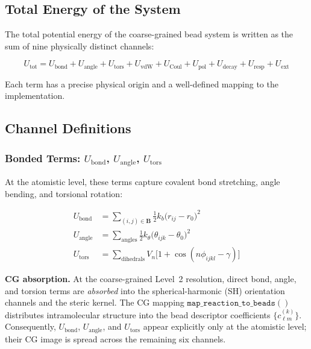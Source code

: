 \documentclass[11pt, a4paper, oneside]{article}
\begin{document}
\subsection{Total Energy of the System}

The total potential energy of the coarse-grained bead system is written as
the sum of nine physically distinct channels:

\begin{equation}
\boxed{
U_{\mathrm{tot}}
= U_{\mathrm{bond}}
+ U_{\mathrm{angle}}
+ U_{\mathrm{tors}}
+ U_{\mathrm{vdW}}
+ U_{\mathrm{Coul}}
+ U_{\mathrm{pol}}
+ U_{\mathrm{decay}}
+ U_{\mathrm{resp}}
+ U_{\mathrm{ext}}
}
\label{eq:Utot}
\end{equation}

Each term has a precise physical origin and a well-defined mapping to the
implementation.

\subsection{Channel Definitions}

\subsubsection{Bonded Terms:
  \texorpdfstring{$U_{\mathrm{bond}}$, $U_{\mathrm{angle}}$,
  $U_{\mathrm{tors}}$}{U\_bond, U\_angle, U\_tors}}

At the atomistic level, these terms capture covalent bond stretching,
angle bending, and torsional rotation:

\begin{align}
U_{\mathrm{bond}}  &= \sum_{(i,j) \in \mathbf{B}} \tfrac{1}{2} k_b
                       \bigl(r_{ij} - r_0\bigr)^2
  \label{eq:Ubond} \\[6pt]
U_{\mathrm{angle}} &= \sum_{\mathrm{angles}} \tfrac{1}{2} k_\theta
                       \bigl(\theta_{ijk} - \theta_0\bigr)^2
  \label{eq:Uangle} \\[6pt]
U_{\mathrm{tors}}  &= \sum_{\mathrm{dihedrals}} V_n
                       \bigl[1 + \cos(n\phi_{ijkl} - \gamma)\bigr]
  \label{eq:Utors}
\end{align}

\noindent\textbf{CG absorption.}
At the coarse-grained Level~2 resolution, direct bond, angle, and
torsion terms are \emph{absorbed} into the spherical-harmonic (SH)
orientation channels and the steric kernel.  The CG mapping
$\texttt{map\_reaction\_to\_beads}()$ distributes intramolecular
structure into the bead descriptor coefficients
$\{c_{\ell m}^{(k)}\}$.  Consequently, $U_{\mathrm{bond}}$,
$U_{\mathrm{angle}}$, and $U_{\mathrm{tors}}$ appear explicitly
only at the atomistic level; their CG image is spread across the
remaining six channels.
\end{document}
